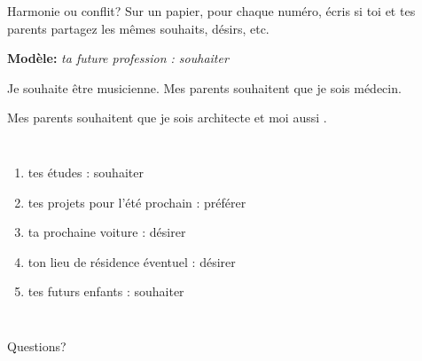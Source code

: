 \documentclass{beamer}
\begin{document}
  \begin{frame}{Harmonie ou conflit?}
    \small
    Sur un papier, pour chaque numéro, écris si toi et tes parents partagez les mêmes souhaits, désirs, etc.
    \begin{description}
      \item[] \textbf{Modèle:} \emph{ta future profession : souhaiter}
      \item Je souhaite \alert{être} musicienne. Mes parents souhaitent \alert{que je sois} médecin.
      \item[OU] Mes parents souhaitent \alert{que je sois} architecte et moi aussi .
    \end{description}
    \begin{columns}
        \begin{enumerate}
          \item tes études : souhaiter
          \item tes projets pour l'été prochain : préférer
          \item ta prochaine voiture : désirer
          \item ton lieu de résidence éventuel : désirer
          \item tes futurs enfants : souhaiter
        \end{enumerate}
    \end{columns}
  \end{frame}

  \begin{frame}{}
    \begin{center}
      \Large Questions?
    \end{center}
  \end{frame}
\end{document}
